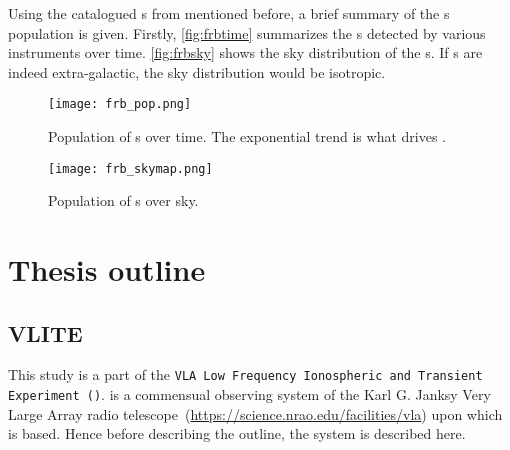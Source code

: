 \par Using the catalogued \frb{}s from  mentioned before, a brief summary of the \frb{}s population is given.
Firstly, \autoref{fig:frbtime} summarizes the \frb{}s detected by various instruments over time. \autoref{fig:frbsky} shows the sky distribution of the \frb{}s.
If \frb{}s are indeed extra-galactic, the sky distribution would be isotropic.

\begin{figure}
	\label{fig:frbtime}
	\centering
	\texttt{[image: frb\_pop.png]}
	\caption{Population of \frb{}s over time. The exponential trend is what drives \vf.}
\end{figure}

\begin{figure}
	\label{fig:frbsky}
	\centering
	\texttt{[image: frb\_skymap.png]}
	\caption{Population of \frb{}s over sky. }
\end{figure}




\section{Thesis outline}

\subsection{VLITE}

\par This study is a part of the \texttt{VLA Low Frequency Ionospheric and Transient Experiment (\vlite)}. 
\vlite is a commensual observing system of the Karl G. Janksy Very Large Array radio telescope~(\url{https://science.nrao.edu/facilities/vla}) upon which \vf is based. 
Hence before describing the outline, the \vlite system is described here.

